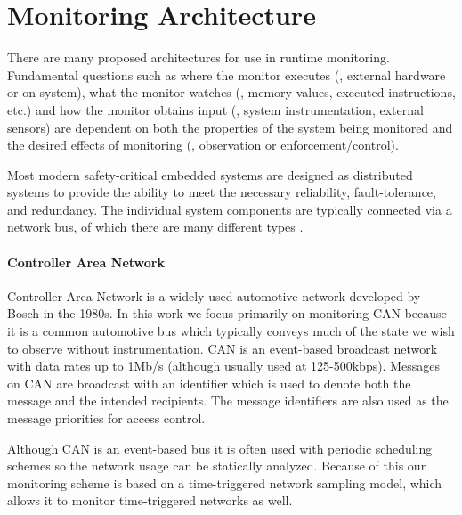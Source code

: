 
\section{Monitoring Architecture}
There are many proposed architectures for use in runtime monitoring. Fundamental questions such as where the monitor executes (\eg, external hardware or on-system), what the monitor watches (\eg, memory values, executed instructions, etc.) and how the monitor obtains input (\eg, system instrumentation, external sensors) are dependent on both the properties of the system being monitored and the desired effects of monitoring (\ie, observation or enforcement/control).  

Most modern safety-critical embedded systems are designed as distributed systems to provide the ability to meet the necessary reliability, fault-tolerance, and redundancy. The individual system components are typically connected via a network bus, of which there are many different types \cite{Rushby2001}. %
%
\paragraph{Controller Area Network} %
Controller Area Network is a widely used automotive network developed by Bosch in the 1980s. 
In this work we focus primarily on monitoring CAN because it is a common automotive bus which typically conveys much of the state we wish to observe without instrumentation.
%
CAN is an event-based broadcast network with data rates up to 1Mb/s (although usually used at 125-500kbps). Messages on CAN are broadcast with an identifier which is used to denote both the message and the intended recipients. The message identifiers are also used as the message priorities for access control.

Although CAN is an event-based bus it is often used with periodic scheduling schemes so the network usage can be statically analyzed. Because of this our monitoring scheme is based on a time-triggered network sampling model, which allows it to monitor time-triggered networks as well.

